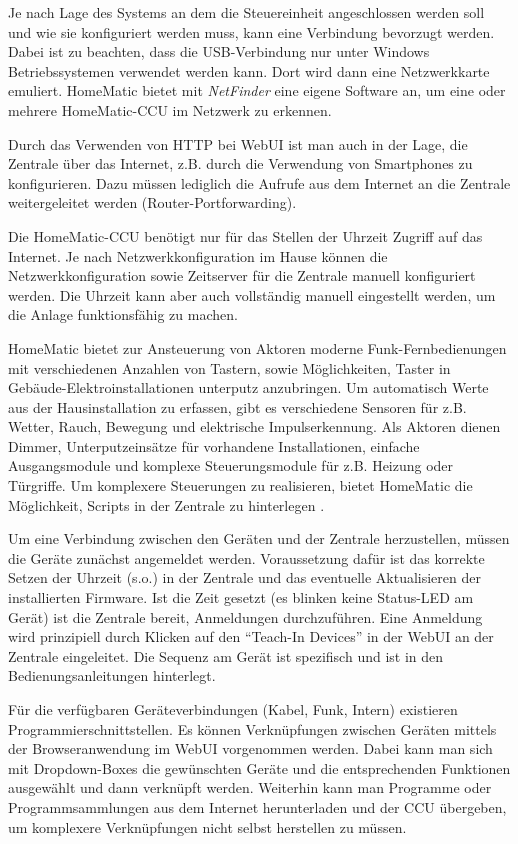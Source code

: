 Je nach Lage des Systems an dem die Steuereinheit angeschlossen werden soll und wie sie konfiguriert
werden muss, kann eine Verbindung bevorzugt werden.
Dabei ist zu beachten, dass die USB-Verbindung nur unter Windows Betriebssystemen
verwendet werden kann.
Dort wird dann eine Netzwerkkarte emuliert.
HomeMatic bietet mit \emph{NetFinder} eine eigene Software an, um eine oder mehrere
HomeMatic-CCU im Netzwerk zu erkennen.

Durch das Verwenden von HTTP bei WebUI ist man auch in der Lage, die Zentrale
über das Internet, z.B. durch die Verwendung von Smartphones zu konfigurieren.
Dazu müssen lediglich die Aufrufe aus dem Internet an die Zentrale weitergeleitet werden
(Router-Portforwarding).

Die HomeMatic-CCU benötigt nur für das Stellen der Uhrzeit Zugriff auf das Internet.
Je nach Netzwerkkonfiguration im Hause können die Netzwerkkonfiguration sowie Zeitserver
für die Zentrale manuell konfiguriert werden.
Die Uhrzeit kann aber auch vollständig manuell eingestellt werden, um die Anlage
funktionsfähig zu machen.

HomeMatic bietet zur Ansteuerung von Aktoren moderne Funk-Fernbedienungen mit verschiedenen
Anzahlen von Tastern, sowie Möglichkeiten, Taster in Gebäude-Elektroinstallationen unterputz anzubringen.
Um automatisch Werte aus der Hausinstallation zu erfassen, gibt es verschiedene Sensoren für z.B.
Wetter, Rauch, Bewegung und elektrische Impulserkennung.
Als Aktoren dienen Dimmer, Unterputzeinsätze für vorhandene Installationen, einfache Ausgangsmodule und
komplexe Steuerungsmodule für z.B. Heizung oder Türgriffe.
Um komplexere Steuerungen zu realisieren, bietet HomeMatic die Möglichkeit, Scripts in der Zentrale
zu hinterlegen \cite{hmscript1}.

Um eine Verbindung zwischen den Geräten und der Zentrale herzustellen, müssen die Geräte zunächst
angemeldet werden.
Voraussetzung dafür ist das korrekte Setzen der Uhrzeit (s.o.) in der Zentrale und das eventuelle
Aktualisieren der installierten Firmware.
Ist die Zeit gesetzt (es blinken keine Status-LED am Gerät) ist die Zentrale bereit, Anmeldungen
durchzuführen.
Eine Anmeldung wird prinzipiell durch Klicken auf den ``Teach-In Devices''
in der WebUI an der Zentrale eingeleitet.
Die Sequenz am Gerät ist spezifisch und ist in den Bedienungsanleitungen hinterlegt.

Für die verfügbaren Geräteverbindungen (Kabel, Funk, Intern) existieren Programmierschnittstellen.
Es können Verknüpfungen zwischen Geräten mittels der Browseranwendung im WebUI vorgenommen werden.
Dabei kann man sich mit Dropdown-Boxes die gewünschten Geräte und die entsprechenden Funktionen
ausgewählt und dann verknüpft werden.
Weiterhin kann man Programme oder Programmsammlungen aus dem Internet herunterladen und der CCU
übergeben, um komplexere Verknüpfungen nicht selbst herstellen zu müssen.

